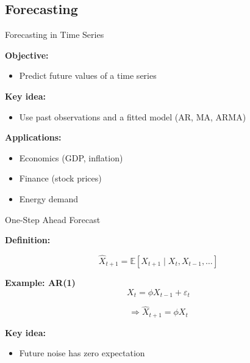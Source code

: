 \documentclass[aspectratio=169]{beamer}
\begin{document}
\subsection{Forecasting}

\begin{frame}{Forecasting in Time Series}

\textbf{Objective:}
\begin{itemize}
    \item Predict future values of a time series
\end{itemize}

\vspace{0.4cm}

\textbf{Key idea:}
\begin{itemize}
    \item Use past observations and a fitted model (AR, MA, ARMA)
\end{itemize}

\vspace{0.4cm}

\textbf{Applications:}
\begin{itemize}
    \item Economics (GDP, inflation)
    \item Finance (stock prices)
    \item Energy demand
\end{itemize}

\end{frame}

\begin{frame}{One-Step Ahead Forecast}

\textbf{Definition:}

\[
\hat{X}_{t+1} = \mathbb{E}[X_{t+1} \mid X_t, X_{t-1}, \dots]
\]

\vspace{0.4cm}

\textbf{Example: AR(1)}
\[
X_t = \phi X_{t-1} + \varepsilon_t
\]

\[
\Rightarrow \hat{X}_{t+1} = \phi X_t
\]

\vspace{0.4cm}

\textbf{Key idea:}
\begin{itemize}
    \item Future noise has zero expectation
\end{itemize}

\end{frame}
\end{document}
